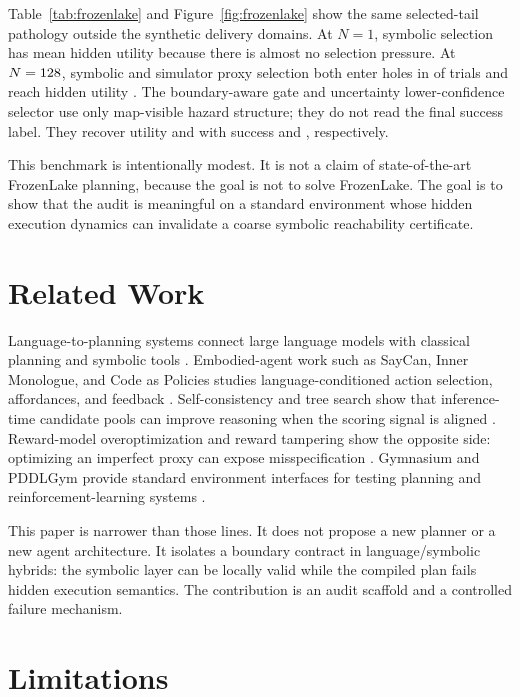 \documentclass{article}
\begin{document}
Table~\ref{tab:frozenlake} and Figure~\ref{fig:frozenlake} show the same
selected-tail pathology outside the synthetic delivery domains. At $N=1$,
symbolic selection has mean hidden utility \FrozenNOneUtility{} because there
is almost no selection pressure. At $N=128{}$, symbolic and simulator
proxy selection both enter holes in \FrozenSymbolicHole{} of trials and reach
hidden utility \FrozenSymbolicUtility{}. The boundary-aware gate and
uncertainty lower-confidence selector use only map-visible hazard structure;
they do not read the final success label. They recover utility
\FrozenHazardGateUtility{} and \FrozenLCBUtility{} with success
\FrozenHazardGateSuccess{} and \FrozenLCBSuccess{}, respectively.

This benchmark is intentionally modest. It is not a claim of state-of-the-art
FrozenLake planning, because the goal is not to solve FrozenLake. The goal is
to show that the audit is meaningful on a standard environment whose hidden
execution dynamics can invalidate a coarse symbolic reachability certificate.

\section{Related Work}

Language-to-planning systems connect large language models with classical
planning and symbolic tools \citep{llmp,react,tot}. Embodied-agent work such as
SayCan, Inner Monologue, and Code as Policies studies language-conditioned
action selection, affordances, and feedback \citep{saycan,inner,codepolicies}.
Self-consistency and tree search show that inference-time candidate pools can
improve reasoning when the scoring signal is aligned \citep{selfconsistency,tot}.
Reward-model overoptimization and reward tampering show the opposite side:
optimizing an imperfect proxy can expose misspecification \citep{gao,everitt}.
Gymnasium and PDDLGym provide standard environment interfaces for testing
planning and reinforcement-learning systems \citep{gymnasium,pddlgym}.

This paper is narrower than those lines. It does not propose a new planner or a
new agent architecture. It isolates a boundary contract in language/symbolic
hybrids: the symbolic layer can be locally valid while the compiled plan fails
hidden execution semantics. The contribution is an audit scaffold and a
controlled failure mechanism.

\section{Limitations}
\end{document}
